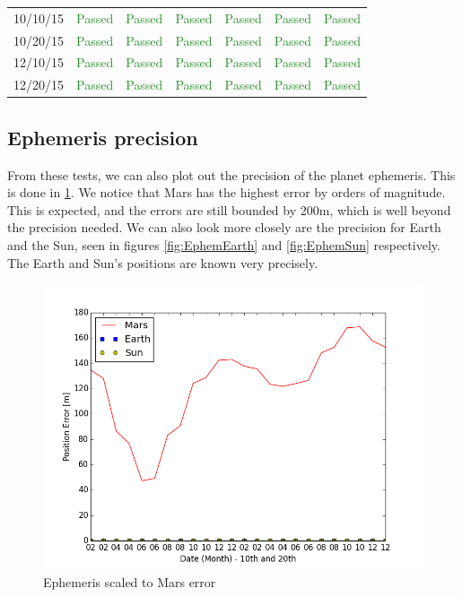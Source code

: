 \documentclass[]{BasiliskReportMemo}
\begin{document}
\begin{table}[htbp]
\begin{tabular}{c | c | c | c | c | c | c}
      10/10/15 & \textcolor{ForestGreen}{Passed} & \textcolor{ForestGreen}{Passed} &  \textcolor{ForestGreen}{Passed}&  \textcolor{ForestGreen}{Passed} & \textcolor{ForestGreen}{Passed} &  \textcolor{ForestGreen}{Passed}\\
      10/20/15 & \textcolor{ForestGreen}{Passed} & \textcolor{ForestGreen}{Passed} &  \textcolor{ForestGreen}{Passed}&  \textcolor{ForestGreen}{Passed} & \textcolor{ForestGreen}{Passed} &  \textcolor{ForestGreen}{Passed}\\
      12/10/15 & \textcolor{ForestGreen}{Passed} & \textcolor{ForestGreen}{Passed} &  \textcolor{ForestGreen}{Passed}&  \textcolor{ForestGreen}{Passed} & \textcolor{ForestGreen}{Passed} &  \textcolor{ForestGreen}{Passed}\\
      12/20/15 & \textcolor{ForestGreen}{Passed} & \textcolor{ForestGreen}{Passed} &  \textcolor{ForestGreen}{Passed}&  \textcolor{ForestGreen}{Passed} & \textcolor{ForestGreen}{Passed} &  \textcolor{ForestGreen}{Passed}\\
      \hline
   \end{tabular}
\end{table}


\subsection{Ephemeris precision}

From these tests, we can also plot out the precision of the planet ephemeris. This is done in \ref{fig:Ephem}. We notice that Mars has the highest error by orders of magnitude. This is expected, and the errors are still bounded by 200m, which is well beyond the precision needed. We can also look more closely are the precision for Earth and the Sun, seen in figures  \ref{fig:EphemEarth} and  \ref{fig:EphemSun} respectively. The Earth and Sun's positions are known very precisely. 


\begin{figure}[htb]
	\centerline{
	\includegraphics[scale=0.65]{Figures/Ephem.png}
	}
	\caption{Ephemeris scaled to Mars error}
	\label{fig:Ephem}
\end{figure}
\end{document}
